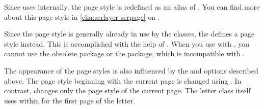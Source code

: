 \begin{description}
  Since  uses
  \hyperref[cha:scrlayer-scrpage]{} internally, the
   page style is redefined as an alias of
  . You can find more
  about this page style in \autoref{cha:scrlayer-scrpage} on
  .
\item[{\PageStyle{plain.letter}}]
  Since the  page style is generally already in use by the
  classes, the  defines a
   page style instead. This is accomplished with the
  help of \hyperref[cha:scrlayer-scrpage]{}.
  When you use
  \hyperref[cha:scrlayer-scrpage]{} with
  , you cannot use the obsolete
   package or the
   package, which is incompatible
  with \KOMAScript{}.
\end{description}

The appearance of the page styles is also influenced by
the
 and
 options
described above. The page style beginning with the current page is changed
using . In contrast,  changes only the
page style of the current page. The letter class itself
uses  within
 for the first page of the
letter.

